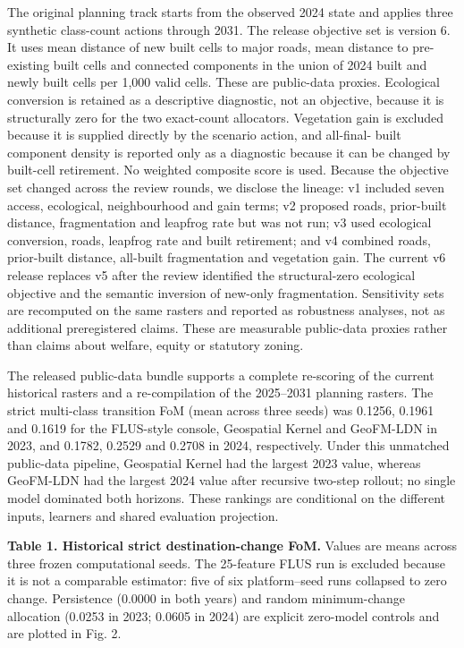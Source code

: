The original planning track starts from the observed 2024 state and
applies three synthetic class-count actions through 2031. The release
objective set is version 6. It uses mean distance of new built cells to
major roads, mean distance to pre-existing built cells and connected
components in the union of 2024 built and newly built cells per 1,000
valid cells. These are public-data proxies. Ecological conversion is
retained as a descriptive diagnostic, not an objective, because it is
structurally zero for the two exact-count allocators. Vegetation gain is
excluded because it is supplied directly by the scenario action, and
all-final- built component density is reported only as a diagnostic
because it can be changed by built-cell retirement. No weighted
composite score is used. Because the objective set changed across the
review rounds, we disclose the lineage: v1 included seven access,
ecological, neighbourhood and gain terms; v2 proposed roads, prior-built
distance, fragmentation and leapfrog rate but was not run; v3 used
ecological conversion, roads, leapfrog rate and built retirement; and v4
combined roads, prior-built distance, all-built fragmentation and
vegetation gain. The current v6 release replaces v5 after the review
identified the structural-zero ecological objective and the semantic
inversion of new-only fragmentation. Sensitivity sets are recomputed on
the same rasters and reported as robustness analyses, not as additional
preregistered claims. These are measurable public-data proxies rather
than claims about welfare, equity or statutory zoning.

The released public-data bundle supports a complete re-scoring of the
current historical rasters and a re-compilation of the 2025--2031
planning rasters. The strict multi-class transition FoM (mean across
three seeds) was 0.1256, 0.1961 and 0.1619 for the FLUS-style console,
Geospatial Kernel and GeoFM-LDN in 2023, and 0.1782, 0.2529 and 0.2708
in 2024, respectively. Under this unmatched public-data pipeline,
Geospatial Kernel had the largest 2023 value, whereas GeoFM-LDN had the
largest 2024 value after recursive two-step rollout; no single model
dominated both horizons. These rankings are conditional on the different
inputs, learners and shared evaluation projection.

\textbf{Table 1. Historical strict destination-change FoM.} Values are
means across three frozen computational seeds. The 25-feature FLUS run
is excluded because it is not a comparable estimator: five of six
platform--seed runs collapsed to zero change. Persistence (0.0000 in
both years) and random minimum-change allocation (0.0253 in 2023; 0.0605
in 2024) are explicit zero-model controls and are plotted in Fig. 2.

